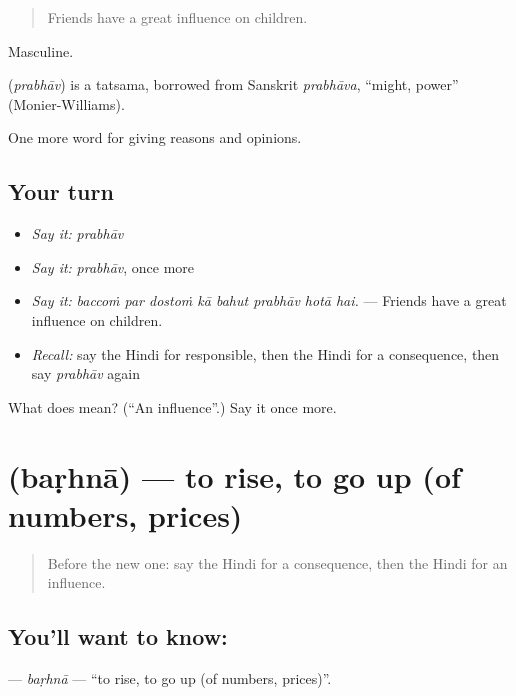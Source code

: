 \begin{quote}
Friends have a great influence on children.
\end{quote}

Masculine.

\begin{cousinweb}
\textbf{} (\emph{prabhāv}) is a tatsama, borrowed from Sanskrit \emph{prabhāva}, \textquotedblleft{}might, power\textquotedblright{} (Monier-Williams).
\end{cousinweb}

\begin{grammarlens}[title={What you've built}]
One more word for giving reasons and opinions.
\end{grammarlens}

\subsection*{Your turn}
\begin{itemize}
\raggedright
  \item \emph{Say it:} \emph{prabhāv}
  \item \emph{Say it:} \emph{prabhāv}, once more
  \item \emph{Say it:} \emph{baccoṁ par dostoṁ kā bahut prabhāv hotā hai.} — Friends have a great influence on children.
  \item \emph{Recall:} say the Hindi for responsible, then the Hindi for a consequence, then say \emph{prabhāv} again
\end{itemize}

\begin{tcolorbox}[breakable,colback=teal!4,colframe=teal!35!black,title={Before you move on}]
What does  mean? (\textquotedblleft{}An influence\textquotedblright{}.) Say it once more.
\end{tcolorbox}
\section[\texorpdfstring{\hi{बढ़ना} (baṛhnā)}{बढ़ना (baṛhnā)}]{ (baṛhnā) — to rise, to go up (of numbers, prices)}

\label{lesson:HI-C344-barhna}



\begin{quote}
Before the new one: say the Hindi for a consequence, then the Hindi for an influence.
\end{quote}

\subsection*{You'll want to know: }
\textbf{} — \emph{baṛhnā} — \textquotedblleft{}to rise, to go up (of numbers, prices)\textquotedblright{}.

